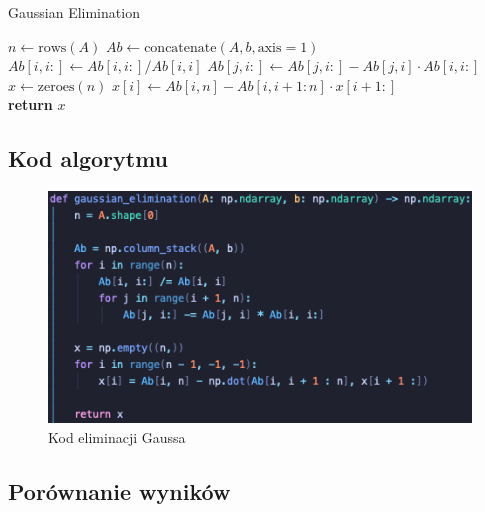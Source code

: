 \documentclass{article}
\begin{document}
\begin{algorithm}[H]
\caption{Gaussian Elimination}
\begin{algorithmic}[1]
    \State $n \gets \text{rows}(A)$
    \State $Ab \gets \text{concatenate}(A, b, \text{axis}=1)$
    \\
        \State $Ab[i, i:] \gets Ab[i, i:] / Ab[i, i]$
            \State $Ab[j, i:] \gets Ab[j, i:] - Ab[j, i] \cdot Ab[i, i:]$
        \EndFor
    \EndFor
    \\
    \State $x \gets \text{zeroes}(n)$
        \State $x[i] \gets Ab[i, n] - Ab[i, i+1 : n] \cdot x[i+1 :]$
    \EndFor
    \\
    \State \textbf{return} $x$
\EndProcedure
\end{algorithmic}
\end{algorithm}

\subsection{Kod algorytmu}

\begin{figure}[htbp]
  \centering
  \includegraphics[width=0.9\linewidth]{gaussian_elimination.png}
  \caption{Kod eliminacji Gaussa}
  \label{fig:gaussian_elimination}
\end{figure}

\subsection{Porównanie wyników}
\end{document}
